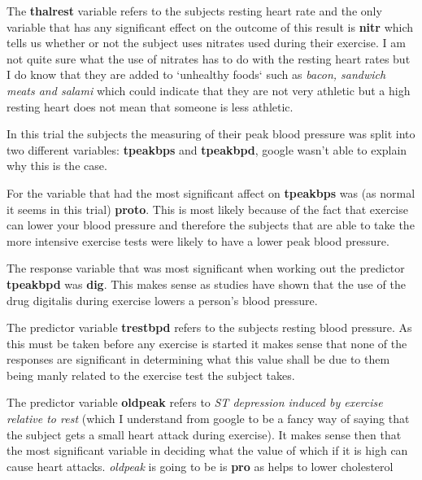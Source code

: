 \documentclass[a4paper]{article}
\begin{document}
\newpage

The \textbf{thalrest} variable refers to the subjects resting heart rate and the
only variable that has any significant effect on the outcome of this result is
\textbf{nitr} which tells us whether or not the subject uses nitrates used
during their exercise. I am not quite sure what the use of nitrates has to do
with the resting heart rates but I do know that they are added to `unhealthy
foods` such as \textit{bacon, sandwich meats and salami} which could indicate
that they are not very athletic but a high resting heart does not mean that
someone is less athletic.

\newpage
In this trial the subjects the measuring of their peak blood pressure was split
into two different variables: \textbf{tpeakbps} and \textbf{tpeakbpd}, google
wasn't able to explain why this is the case.

For the variable that had the most significant affect on \textbf{tpeakbps} was
(as normal it seems in this trial) \textbf{proto}. This is most likely because
of the fact that exercise can lower your blood pressure and therefore the
subjects that are able to take the more intensive exercise tests were likely to
have a lower peak blood pressure.

\newpage

The response variable that was most significant when working out the predictor
\textbf{tpeakbpd} was \textbf{dig}.  This makes sense as studies have shown that
the use of the drug digitalis during exercise lowers a person's blood pressure.

\newpage

The predictor variable \textbf{trestbpd} refers to the subjects resting blood
pressure. As this must be taken before any exercise is started it makes sense
that none of the responses are significant in determining what this value shall
be due to them being manly related to the exercise test the subject takes.

\newpage

The predictor variable \textbf{oldpeak} refers to \textit{ST depression induced
by exercise relative to rest} (which I understand from google to be a fancy way
of saying that the subject gets a small heart attack during exercise). It makes
sense then that the most significant variable in deciding what the value of
which if it is high can cause heart attacks.
\textit{oldpeak} is going to be is \textbf{pro} as helps to lower cholesterol
\end{document}

